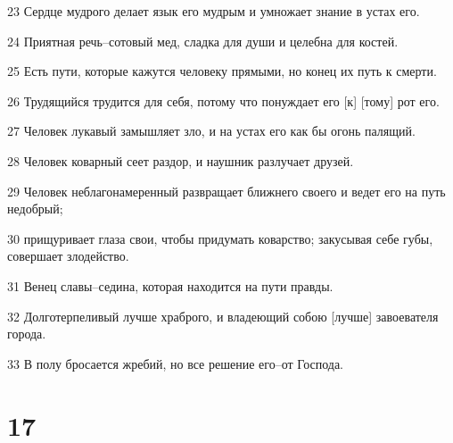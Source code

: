 \par 23 Сердце мудрого делает язык его мудрым и умножает знание в устах его.
\par 24 Приятная речь--сотовый мед, сладка для души и целебна для костей.
\par 25 Есть пути, которые кажутся человеку прямыми, но конец их путь к смерти.
\par 26 Трудящийся трудится для себя, потому что понуждает его [к] [тому] рот его.
\par 27 Человек лукавый замышляет зло, и на устах его как бы огонь палящий.
\par 28 Человек коварный сеет раздор, и наушник разлучает друзей.
\par 29 Человек неблагонамеренный развращает ближнего своего и ведет его на путь недобрый;
\par 30 прищуривает глаза свои, чтобы придумать коварство; закусывая себе губы, совершает злодейство.
\par 31 Венец славы--седина, которая находится на пути правды.
\par 32 Долготерпеливый лучше храброго, и владеющий собою [лучше] завоевателя города.
\par 33 В полу бросается жребий, но все решение его--от Господа.

\chapter{17}

